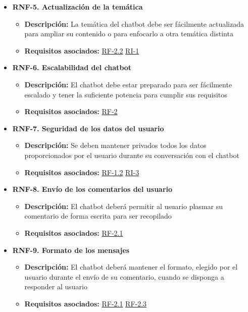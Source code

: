 \begin{itemize}
    \item \textbf{RNF-5. Actualización de la temática} \label{RNF-5}
    \begin{itemize}
        \item \textbf{Descripción:} La temática del chatbot debe ser fácilmente actualizada para ampliar su contenido o para enfocarlo a otra temática distinta
        \item \textbf{Requisitos asociados:} \hyperref[RF-2.2]{RF-2.2} \hyperref[RI-1]{RI-1}
    \end{itemize}
    
    \item \textbf{RNF-6. Escalabilidad del chatbot} \label{RNF-6}
    \begin{itemize}
        \item \textbf{Descripción:} El chatbot debe estar preparado para ser fácilmente escalado y tener la suficiente potencia para cumplir sus requisitos
        \item \textbf{Requisitos asociados:} \hyperref[RF-2]{RF-2}
    \end{itemize}
    
    \item \textbf{RNF-7. Seguridad de los datos del usuario} \label{RNF-7}
    \begin{itemize}
        \item \textbf{Descripción:} Se deben mantener privados todos los datos proporcionados por el usuario durante su conversación con el chatbot
        \item \textbf{Requisitos asociados:} \hyperref[RF-1.2]{RF-1.2} \hyperref[RI-3]{RI-3}
    \end{itemize}
    
    \item \textbf{RNF-8. Envío de los comentarios del usuario} \label{RNF-8}
    \begin{itemize}
        \item \textbf{Descripción:} El chatbot deberá permitir al usuario plasmar su comentario de forma escrita para ser recopilado
        \item \textbf{Requisitos asociados:} \hyperref[RF-2.1]{RF-2.1}
    \end{itemize}
    
    \item \textbf{RNF-9. Formato de los mensajes} \label{RNF-9}
    \begin{itemize}
        \item \textbf{Descripción:} El chatbot deberá mantener el formato, elegido por el usuario durante el envío de su comentario, cuando se disponga a responder al usuario
        \item \textbf{Requisitos asociados:} \hyperref[RF-2.1]{RF-2.1} \hyperref[RF-2.3]{RF-2.3}
    \end{itemize}
    

\end{itemize}
